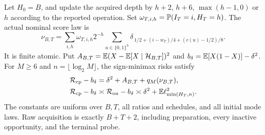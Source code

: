 \begin{theorem}\label{thm:singular}
Let $H_0=B$, and update the acquired depth by $h+2$, $h+6$, $\max(h-1,0)$ or $h$ according to the reported operation. Set $\omega_{T,i,h}=\mathbb P(I_T=i,H_T=h)$. The actual nominal score law is
\begin{equation}\label{eq:atomic}
 \nu_{B,T}=\sum_{i,h}\omega_{T,i,h}2^{-h}
   \sum_{u\in\{0,1\}^h}
    \delta_{\,1/2+(i-w_T)/4+(c(u)-1/2)/8}.
\end{equation}
It is finite atomic. Put $A_{B,T}=\mathbb E(X-\mathbb E[X\mid\mathcal H_{B,T}])^2$ and $b_\delta=\mathbb E[X(1-X)]-\delta^2$. For $M\ge6$ and $n=\lfloor\log_2 M\rfloor$, the sign-minimax risks satisfy
\begin{align}
 \mathcal R_{\mathrm{cp}}-b_\delta&=\delta^2+A_{B,T}+q_M(\nu_{B,T}),\label{eq:singularexact}\\
 \mathcal R_{\mathrm{cp}}-b_\delta&\asymp\mathcal R_{\mathrm{on}}-b_\delta
 \asymp\delta^2+\mathbb E\ell_{\min(H_T,n)}^2.\label{eq:singularlaw}
\end{align}
The constants are uniform over $B,T$, all ratios and schedules, and all initial mode laws. Raw acquisition is exactly $B+T+2$, including preparation, every inactive opportunity, and the terminal probe.
\end{theorem}
